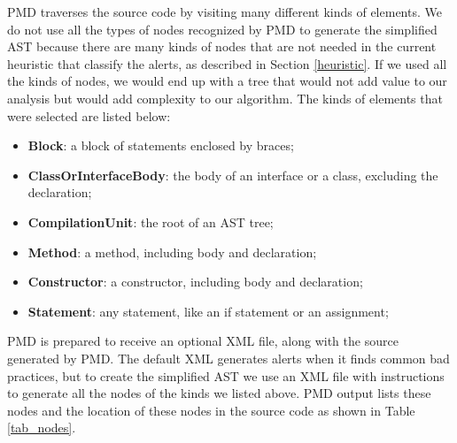 \documentclass[
]{article}
\begin{document}
PMD traverses the source code by visiting many different kinds of
elements. We do not use all the types of nodes recognized by PMD to
generate the simplified AST because there are many kinds of nodes that
are not needed in the current heuristic that classify the alerts, as
described in Section \ref{heuristic}. If we used all the kinds of nodes,
we would end up with a tree that would not add value to our analysis but
would add complexity to our algorithm. The kinds of elements that were
selected are listed below:

\begin{itemize}


\item \textbf{Block}: a block of statements enclosed by braces;

\item \textbf{ClassOrInterfaceBody}: the body of an interface or a class, excluding the declaration;

\item \textbf{CompilationUnit}: the root of an AST tree;

\item \textbf{Method}: a method, including body and declaration;

\item \textbf{Constructor}: a constructor, including body and declaration;

\item \textbf{Statement}: any statement, like an if statement or an assignment;

\end{itemize}

PMD is prepared to receive an optional XML file, along with the source
generated by PMD. The default XML generates alerts when it finds common
bad practices, but to create the simplified AST we use an XML file with
instructions to generate all the nodes of the kinds we listed above. PMD
output lists these nodes and the location of these nodes in the source
code as shown in Table \ref{tab_nodes}.

\small
\end{document}
